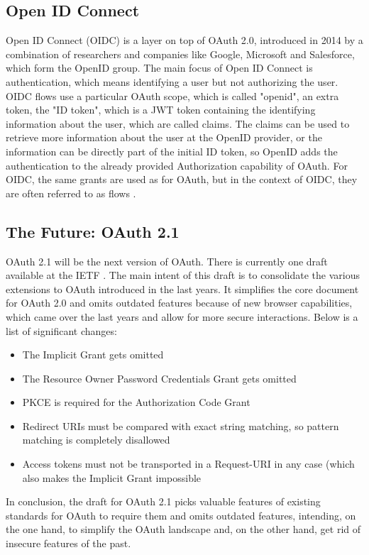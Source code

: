 \documentclass[
    fontsize=12pt,
    headings=small,
    parskip=half,           %
    bibliography=totoc,
    numbers=noenddot,       %
    open=any,               %
    ]{scrreprt}
\begin{document}
\subsection{Open ID Connect}
Open ID Connect (OIDC) is a layer on top of OAuth 2.0, introduced in 2014 by a combination of researchers and companies like Google, Microsoft and Salesforce, which form the OpenID group. The main focus of Open ID Connect is authentication, which means identifying a user but not authorizing the user. OIDC flows use a particular OAuth scope, which is called "openid", an extra token, the "ID token", which is a JWT token containing the identifying information about the user, which are called claims. The claims can be used to retrieve more information about the user at the OpenID provider, or the information can be directly part of the initial ID token, so OpenID adds the authentication to the already provided Authorization capability of OAuth. For OIDC, the same grants are used as for OAuth, but in the context of OIDC, they are often referred to as flows \cite{li2016analysing} \cite{sakimura2014openid}.

\subsection{The Future: OAuth 2.1}
OAuth 2.1 will be the next version of OAuth. There is currently one draft available at the IETF \cite{ietf-oauth-v2-1-09}. The main intent of this draft is to consolidate the various extensions to OAuth introduced in the last years. It simplifies the core document for OAuth 2.0 and omits outdated features because of new browser capabilities, which came over the last years and allow for more secure interactions. Below is a list of significant changes:
\begin{itemize}
	\item The Implicit Grant gets omitted
	\item The Resource Owner Password Credentials Grant gets omitted
	\item PKCE is required for the Authorization Code Grant
	\item Redirect URIs must be compared with exact string matching, so pattern matching is completely disallowed
	\item Access tokens must not be transported in a Request-URI in any case (which also makes the Implicit Grant impossible
\end{itemize}

In conclusion, the draft for OAuth 2.1 picks valuable features of existing standards for OAuth to require them and omits outdated features, intending, on the one hand, to simplify the OAuth landscape and, on the other hand, get rid of insecure features of the past.
\end{document}
